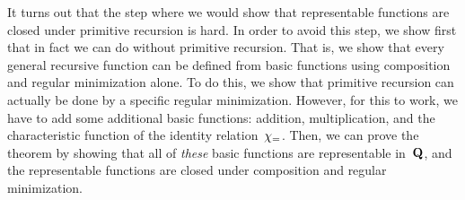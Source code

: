 \documentclass[../../../include/open-logic-section]{subfiles}
\begin{document}
It turns out that the step where we would show that representable
functions are closed under primitive recursion is hard. In order to
avoid this step, we show first that in fact we can do without
primitive recursion. That is, we show that every general recursive
function can be defined from basic functions using composition and
regular minimization alone.  To do this, we show that primitive
recursion can actually be done by a specific regular minimization.
However, for this to work, we have to add some additional basic
functions: addition, multiplication, and the characteristic function
of the identity relation~$\chi_{=}$.  Then, we can prove the theorem
by showing that all of \emph{these} basic functions are representable
in~$\mathbf{Q}$, and the representable functions are closed under
composition and regular minimization.
\end{document}
